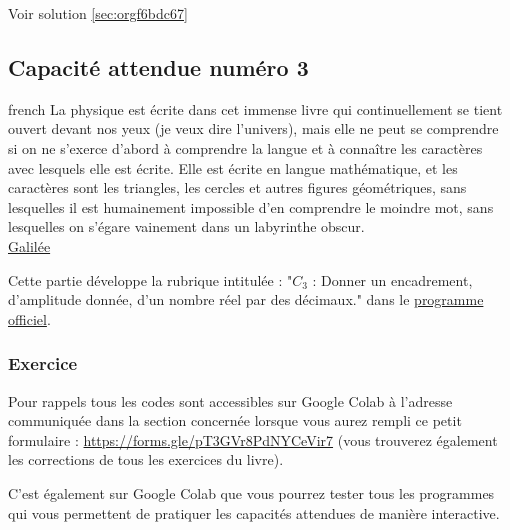 \documentclass[a4paper, 11pt, twoside]{article}
\begin{document}
Voir solution \ref{sec:orgf6bdc67}
\stopcontents[level-2]

\subsection{Capacité attendue numéro 3}
\label{sec:org53eb07f}

\begin{foreigndisplayquote}{french}
La physique est écrite dans cet immense livre qui continuellement
se tient ouvert devant nos yeux (je veux dire l'univers), mais elle
ne peut se comprendre si on ne s'exerce d'abord à comprendre la
langue et à connaître les caractères avec lesquels elle est
écrite. Elle est écrite en langue mathématique, et les caractères
sont les triangles, les cercles et autres figures géométriques,
sans lesquelles il est humainement impossible d'en comprendre le
moindre mot, sans lesquelles on s'égare vainement dans un
labyrinthe obscur.\\

\href{https://fr.wikipedia.org/wiki/Galil\%C3\%A9e\_(savant)}{Galilée}
\end{foreigndisplayquote}

\startcontents[level-2]


Cette partie développe la rubrique intitulée : "\(C_3\) : Donner un
encadrement, d’amplitude donnée, d’un nombre réel par des
décimaux." dans le \href{https://eduscol.education.fr/document/24553/download}{programme officiel}.

\subsubsection{Exercice}
\label{sec:orgdb5a92b}
Pour rappels tous les codes sont accessibles sur Google Colab à
l'adresse communiquée dans la section concernée lorsque vous
aurez rempli ce petit formulaire :
\url{https://forms.gle/pT3GVr8PdNYCeVir7} (vous trouverez également
les corrections de tous les exercices du livre).

C'est également sur Google Colab que vous pourrez tester tous les
programmes qui vous permettent de pratiquer les capacités attendues
de manière interactive.
\end{document}

